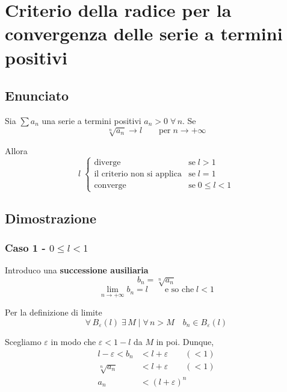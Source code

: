 \documentclass[../dimostrazioni]{subfiles}
\begin{document}
    \chapter{Criterio della radice per la convergenza delle serie a termini positivi}
    \label{criterioRadiceSerie}

        \section*{Enunciato}

            Sia \(\sum a_n\) una serie a termini positivi \(a_n > 0 \; \forall \, n\). Se
             \[\sqrt[n]{a_n} \rightarrow l \qquad \text{per} \; n  \rightarrow +\infty \]
            
            Allora
            \[
                l \;
                \begin{cases}
                    \text{diverge} & \text{se} \; l > 1\\
                    \text{il criterio non si applica} & \text{se} \; l = 1\\
                    \text{converge} & \text{se} \; 0 \leqslant l < 1
                \end{cases}
            \]
            
        \section*{Dimostrazione}
            
            \subsection*{Caso 1 - \(0 \leqslant l < 1\)} 
                    
                Introduco una \textbf{successione ausiliaria}
                \[b_n = \sqrt[n]{a_n} \]  
                \[\lim_{n \to +\infty} b_n = l \qquad \text{e so che} \; l < 1\]

                Per la definizione di limite
                \[\forall \, B_\varepsilon (l) \; \exists \, M \mid \forall \, n > M \quad b_n \in B_\varepsilon (l) \]

                Scegliamo \(\varepsilon\) in modo che \(\varepsilon < 1 - l\) da \(M\) in poi. Dunque,
                \begin{align*}
                    l - \varepsilon < b_n &< l + \varepsilon \qquad (<1) \\
                    \sqrt[n]{a_n} &< l + \varepsilon \qquad (<1) \\
                    a_n &< (l+\varepsilon)^{n}  
                \end{align*}
                                     
\end{document}

